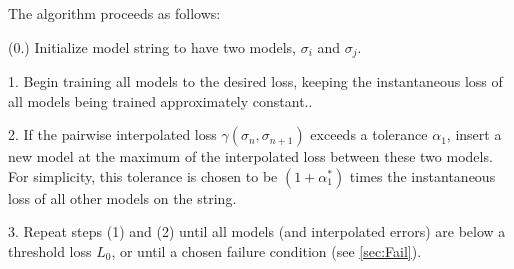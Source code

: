 \documentclass{article} %
\begin{document}
  The algorithm proceeds as follows:
  
  (0.) Initialize model string to have two models, $\sigma_i$ and $\sigma_j$.
  
  1. Begin training all models to the desired loss, keeping the instantaneous loss of all models being trained approximately constant..
  
  2. If the pairwise interpolated loss $\gamma(\sigma_n,\sigma_{n+1})$ exceeds a tolerance $\alpha_1$, insert a new model at the maximum of the interpolated loss between these two models.  For simplicity, this tolerance is chosen to be $(1 + \alpha_1^*)$ times the instantaneous loss of all other models on the string.  
  
  3. Repeat steps (1) and (2) until all models (and interpolated errors) are below a threshold loss $L_0$, or until a chosen failure condition (see \ref{sec:Fail}).





\end{document}

